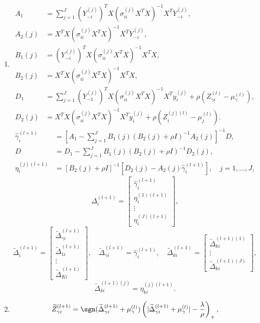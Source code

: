 \begin{enumerate}[label=步骤 \arabic*：,leftmargin=4.8em]
\[\]
执行步骤 2、3 和 4，直至收敛。
\item
\[
\begin{aligned}
A_1&=\sum_{j=1}^J(Y_{-i}^{(j)})^TX(\sigma_{ii}^{(j)}X^TX)^{-1}X^TY_{-i}^{(j)},\\
A_2(j)&=X^TX(\sigma_{ii}^{(j)}X^TX)^{-1}X^TY_{-i}^{(j)},\\
B_1(j)&=(Y_{-i}^{(j)})^TX(\sigma_{ii}^{(j)}X^TX)^{-1}X^TX,\\
B_2(j)&=X^TX(\sigma_{ii}^{(j)}X^TX)^{-1}X^TX,\\
D_1&=\sum_{j=1}^J(Y_{-1}^{(j)})^TX(\sigma_{ii}^{(j)}X^TX)^{-1}X^Ty_i^{(j)}
+\rho(Z_{\gamma i}^{(l)}-\mu_\gamma^{(l)}),\\
D_2(j)&=X^TX(\sigma_{ii}^{(j)}X^TX)^{-1}X^Ty_i^{(j)}
+\rho(Z_i^{(j)(l)}-\mu_j^{(l)}).
\end{aligned}
\]
\[
\begin{aligned}
\widehat\gamma_i^{(l+1)}&=\left[A_1-\sum_{j=1}^JB_1(j)(B_2(j)+\rho I)^{-1}A_2(j)\right]^{-1}D,\\
D&=D_1-\sum_{j=1}^JB_1(j)(B_2(j)+\rho I)^{-1}D_2(j),\\
\eta_i^{(j)(l+1)}&=[B_2(j)+\rho I]^{-1}[D_2(j)-A_2(j)\widehat\gamma_i^{(l+1)}],\quad j=1,\ldots,J,
\end{aligned}
\]
\[
\Delta_i^{(l+1)}=\begin{bmatrix}\widehat\gamma_i^{(l+1)}\\\eta_i^{(1)(l+1)}\\\vdots\\\eta_i^{(J)(l+1)}\end{bmatrix},
\]
\[
\widetilde\Delta_i^{(l+1)}=\begin{bmatrix}\widetilde\Delta_{\gamma i}^{(l+1)}\\\widetilde\Delta_{1i}^{(l+1)}\\\vdots\\\widetilde\Delta_{Ki}^{(l+1)}\end{bmatrix},\quad
\widetilde\Delta_{\gamma i}^{(l+1)}=\widehat\gamma_i^{(l+1)},\quad
\widetilde\Delta_{ki}^{(l+1)}=\begin{bmatrix}\widetilde\Delta_{ki}^{(l+1)(1)}\\\vdots\\\widetilde\Delta_{ki}^{(l+1)(J)}\end{bmatrix},
\]
\[
\widetilde\Delta_{ki}^{(l+1)(j)}=\eta_{ki}^{(j)(l+1)}.
\]
\item
\[
\widetilde Z_{\gamma i}^{(l+1)}=\sgn(\widetilde\Delta_{\gamma i}^{(l+1)}+\mu_\gamma^{(l)})
\left(|\widetilde\Delta_{\gamma i}^{(l+1)}+\mu_\gamma^{(l)}|-\frac\lambda\rho\right)_+,
\]
\end{enumerate}
